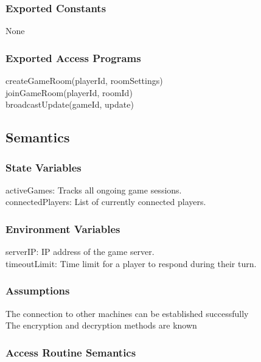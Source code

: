 \documentclass[12pt, titlepage]{article}
\begin{document}
\subsubsection{Exported Constants}
\hspace{1.5em}None

\subsubsection{Exported Access Programs}

\hspace{1.5em}createGameRoom(playerId, roomSettings)\\
\indent joinGameRoom(playerId, roomId)\\
\indent broadcastUpdate(gameId, update)\\

\subsection{Semantics}

\subsubsection{State Variables}
\hspace{1.5em}activeGames: Tracks all ongoing game sessions.\\
\indent connectedPlayers: List of currently connected players.\\


\subsubsection{Environment Variables}
\hspace{1.5em}serverIP: IP address of the game server.\\
\indent timeoutLimit: Time limit for a player to respond during their turn.

\subsubsection{Assumptions}
\hspace{1.5em}The connection to other machines can be established successfully\\
\indent The encryption and decryption methods are known

\subsubsection{Access Routine Semantics}
\end{document}
